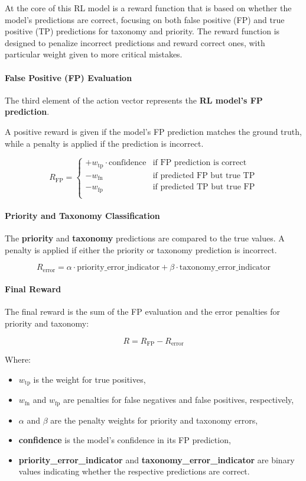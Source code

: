 At the core of this RL model is a reward function that is based on whether the model's predictions are correct, focusing on both false positive (FP) and true positive (TP) predictions for taxonomy and priority. 
The reward function is designed to penalize incorrect predictions and reward correct ones, with particular weight given to more critical mistakes.

\paragraph{False Positive (FP) Evaluation}
The third element of the action vector represents the \textbf{RL model's FP prediction}. 

A positive reward is given if the model's FP prediction matches the ground truth, while a penalty is applied if the prediction is incorrect.

\[
R_{\text{FP}} = 
\begin{cases} 
+ w_{\text{tp}} \cdot \text{confidence} & \text{if FP prediction is correct} \\
- w_{\text{fn}} & \text{if predicted FP but true TP} \\
- w_{\text{fp}} & \text{if predicted TP but true FP} \\
\end{cases}
\label{eq:fp_reward}
\]

\paragraph{Priority and Taxonomy Classification}
The \textbf{priority} and \textbf{taxonomy} predictions are compared to the true values. A penalty is applied if either the priority or taxonomy prediction is incorrect.

\[
R_{\text{error}} = \alpha \cdot \text{priority\_error\_indicator} + \beta \cdot \text{taxonomy\_error\_indicator}
\label{eq:error_penalty}
\]

\paragraph{Final Reward}
The final reward is the sum of the FP evaluation and the error penalties for priority and taxonomy:

\[
R = R_{\text{FP}} - R_{\text{error}}
\label{eq:final_reward}
\]

Where:
\begin{itemize}
    \item \( w_{\text{tp}} \) is the weight for true positives,
    \item \( w_{\text{fn}} \) and \( w_{\text{fp}} \) are penalties for false negatives and false positives, respectively,
    \item \( \alpha \) and \( \beta \) are the penalty weights for priority and taxonomy errors,
    \item \textbf{confidence} is the model’s confidence in its FP prediction,
    \item \textbf{priority\_error\_indicator} and \textbf{taxonomy\_error\_indicator} are binary values indicating whether the respective predictions are correct.
\end{itemize}

